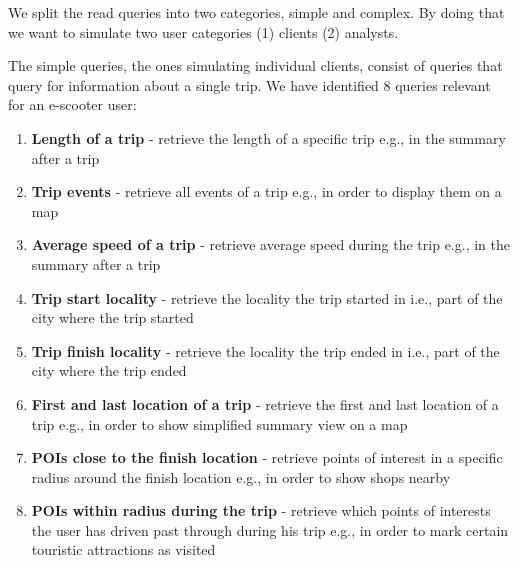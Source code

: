 We split the read queries into two categories, simple and complex.
By doing that we want to simulate two user categories (1) clients (2) analysts.

The simple queries, the ones simulating individual clients, consist of queries that query for information about a single trip.
We have identified 8 queries relevant for an e-scooter user:
\begin{enumerate}
	\item \textbf{Length of a trip} - retrieve the length of a specific trip e.g., in the summary after a trip
	\item \textbf{Trip events} - retrieve all events of a trip e.g., in order to display them on a map
	\item \textbf{Average speed of a trip} - retrieve average speed during the trip e.g., in the summary after a trip
	\item \textbf{Trip start locality} - retrieve the locality the trip started in i.e., part of the city where the trip started
	\item \textbf{Trip finish locality} - retrieve the locality the trip ended in i.e., part of the city where the trip ended
	\item \textbf{First and last location of a trip} - retrieve the first and last location of a trip e.g., in order to show simplified summary view on a map
	\item \textbf{POIs close to the finish location} - retrieve points of interest in a specific radius around the finish location e.g., in order to show shops nearby
	\item \textbf{POIs within radius during the trip} - retrieve which points of interests the user has driven past through during his trip e.g., in order to mark certain touristic attractions as visited
\end{enumerate}

